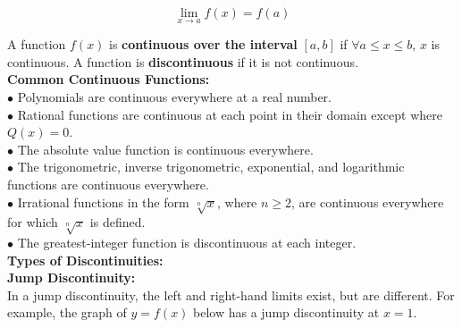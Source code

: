         \begin{equation*}
            \lim_{x\to a}f(x)=f(a)
        \end{equation*}

        \noindent A function $f(x)$ is \textbf{continuous over the interval} $[a,b]$ if
        $\forall a\leq x\leq b$, $x$ is continuous. A function is \textbf{discontinuous} if it
        is not continuous. \\

        \noindent \color{purple} \textbf{Common Continuous Functions:} \color{black} \\
        $\bullet$ Polynomials are continuous everywhere at a real number. \\
        $\bullet$ Rational functions are continuous at each point in their domain except where
        $Q(x)=0$. \\
        $\bullet$ The absolute value function is continuous everywhere. \\
        $\bullet$ The trigonometric, inverse trigonometric, exponential, and logarithmic functions
        are continuous everywhere. \\
        $\bullet$ Irrational functions in the form $\sqrt[n]{x}$, where $n\geq 2$, are continuous
        everywhere for which $\sqrt[n]{x}$ is defined. \\
        $\bullet$ The greatest-integer function is discontinuous at each integer. \\

        \noindent \color{purple} \textbf{Types of Discontinuities:} \\
        \noindent \textbf{Jump Discontinuity:} \color{black} \\
        In a jump discontinuity, the left and right-hand limits exist, but are different.
        For example, the graph of $y=f(x)$ below has a jump discontinuity at $x=1$. \\


